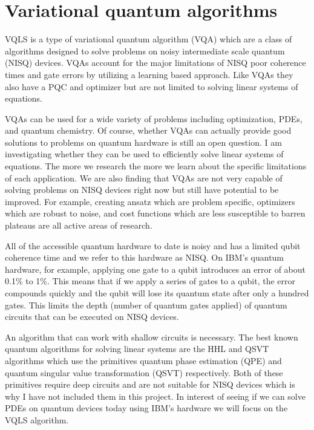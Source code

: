\documentclass[12pt, oneside]{book}
\begin{document}
\section{Variational quantum algorithms}

VQLS is a type of variational quantum algorithm (VQA) which are a class of algorithms designed to solve problems
on noisy intermediate scale quantum (NISQ) devices. VQAs account for the major limitations of NISQ poor 
coherence times and gate errors by utilizing a learning based approach. Like VQAs they also have 
a PQC and optimizer but are not limited to solving linear systems of equations. 

VQAs can be used for a wide variety of problems including optimization, PDEs, and quantum chemistry. 
Of course, whether VQAs can actually provide good solutions to problems on quantum hardware is still an open question. I am 
investigating whether they can be used to efficiently solve linear systems of equations. The more we research the more we 
learn about the specific limitations of each application. We are also finding that VQAs are not very capable of 
solving problems on NISQ devices right now but still have potential to be improved. For example, creating ansatz 
which are problem specific, optimizers which are robust to noise, and cost functions which are less susceptible
to barren plateaus are all active areas of research. 

All of the accessible quantum hardware to date is noisy and has a limited qubit coherence time and we refer to 
this hardware as NISQ. On IBM's quantum hardware, for example, applying one gate to a qubit introduces an error 
of about 0.1\% to 1\%. This means that if we apply a series of gates to a qubit, the error compounds quickly and the qubit 
will lose its quantum state after only a hundred gates. This limits the depth (number of quantum gates applied) of quantum 
circuits that can be executed on NISQ devices.

An algorithm that can work with shallow circuits is necessary. The best known quantum algorithms for solving linear systems 
are the HHL and QSVT algorithms which use the primitives quantum phase estimation (QPE) and quantum singular value transformation
(QSVT) respectively. Both of these primitives require deep circuits and are not suitable for NISQ devices which is why
I have not included them in this project. In interest of seeing if we can solve PDEs on quantum devices today using IBM's 
hardware we will focus on the VQLS algorithm. 
\end{document}
